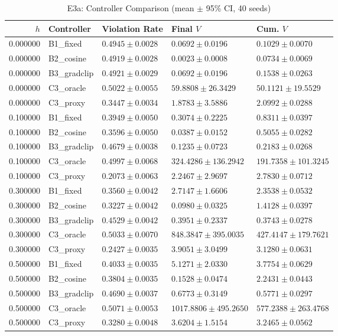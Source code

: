 \begin{table}
\caption{E3a: Controller Comparison (mean $\pm$ 95\% CI, 40 seeds)}
\label{tab:e3a_stats}
\begin{tabular}{rllll}
\toprule
$h$ & Controller & Violation Rate & Final $V$ & Cum. $V$ \\
\midrule
0.000000 & B1_fixed & $0.4945 \pm 0.0028$ & $0.0692 \pm 0.0196$ & $0.1029 \pm 0.0070$ \\
0.000000 & B2_cosine & $0.4919 \pm 0.0028$ & $0.0023 \pm 0.0008$ & $0.0734 \pm 0.0069$ \\
0.000000 & B3_gradclip & $0.4921 \pm 0.0029$ & $0.0692 \pm 0.0196$ & $0.1538 \pm 0.0263$ \\
0.000000 & C3_oracle & $0.5022 \pm 0.0055$ & $59.8808 \pm 26.3429$ & $50.1121 \pm 19.5529$ \\
0.000000 & C3_proxy & $0.3447 \pm 0.0034$ & $1.8783 \pm 3.5886$ & $2.0992 \pm 0.0288$ \\
0.100000 & B1_fixed & $0.3949 \pm 0.0050$ & $0.3074 \pm 0.2225$ & $0.8311 \pm 0.0397$ \\
0.100000 & B2_cosine & $0.3596 \pm 0.0050$ & $0.0387 \pm 0.0152$ & $0.5055 \pm 0.0282$ \\
0.100000 & B3_gradclip & $0.4679 \pm 0.0038$ & $0.1235 \pm 0.0723$ & $0.2183 \pm 0.0268$ \\
0.100000 & C3_oracle & $0.4997 \pm 0.0068$ & $324.4286 \pm 136.2942$ & $191.7358 \pm 101.3245$ \\
0.100000 & C3_proxy & $0.2073 \pm 0.0063$ & $2.2467 \pm 2.9697$ & $2.7830 \pm 0.0712$ \\
0.300000 & B1_fixed & $0.3560 \pm 0.0042$ & $2.7147 \pm 1.6606$ & $2.3538 \pm 0.0532$ \\
0.300000 & B2_cosine & $0.3227 \pm 0.0042$ & $0.0980 \pm 0.0325$ & $1.4128 \pm 0.0397$ \\
0.300000 & B3_gradclip & $0.4529 \pm 0.0042$ & $0.3951 \pm 0.2337$ & $0.3743 \pm 0.0278$ \\
0.300000 & C3_oracle & $0.5033 \pm 0.0070$ & $848.3847 \pm 395.0035$ & $427.4147 \pm 179.7621$ \\
0.300000 & C3_proxy & $0.2427 \pm 0.0035$ & $3.9051 \pm 3.0499$ & $3.1280 \pm 0.0631$ \\
0.500000 & B1_fixed & $0.4033 \pm 0.0035$ & $5.1271 \pm 2.0330$ & $3.7754 \pm 0.0629$ \\
0.500000 & B2_cosine & $0.3804 \pm 0.0035$ & $0.1528 \pm 0.0474$ & $2.2431 \pm 0.0443$ \\
0.500000 & B3_gradclip & $0.4690 \pm 0.0037$ & $0.6773 \pm 0.3149$ & $0.5771 \pm 0.0297$ \\
0.500000 & C3_oracle & $0.5071 \pm 0.0053$ & $1017.8806 \pm 495.2650$ & $577.2388 \pm 263.4768$ \\
0.500000 & C3_proxy & $0.3280 \pm 0.0048$ & $3.6204 \pm 1.5154$ & $3.2465 \pm 0.0562$ \\
\bottomrule
\end{tabular}
\end{table}
